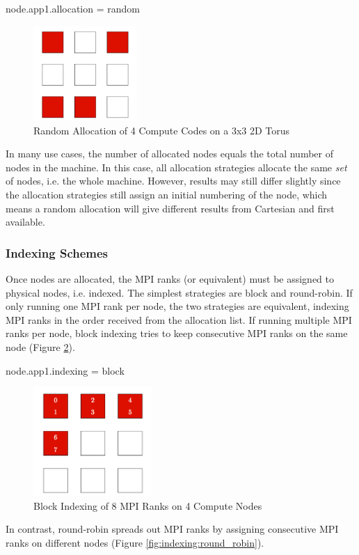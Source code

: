 \begin{ViFile}
node.app1.allocation = random
\end{ViFile}
\begin{figure}[h]
\centering
\includegraphics[width=0.35\textwidth]{figures/tikz/allocation/random.png}
\caption{Random Allocation of 4 Compute Codes on a 3x3 2D Torus}
\label{fig:allocation:random}
\end{figure}

In many use cases, the number of allocated nodes equals the total number of nodes in the machine.
In this case, all allocation strategies allocate the same \emph{set} of nodes, i.e. the whole machine.
However, results may still differ slightly since the allocation strategies still assign an initial numbering of the node,
which means a random allocation will give different results from Cartesian and first available.


\subsubsection{Indexing Schemes}
\label{subsec:tutorial:indexing}
Once nodes are allocated, the MPI ranks (or equivalent) must be assigned to physical nodes, i.e. indexed.
The simplest strategies are block and round-robin.  If only running one MPI rank per node, the two strategies are equivalent,
indexing MPI ranks in the order received from the allocation list.
If running multiple MPI ranks per node, block indexing tries to keep consecutive MPI ranks on the same node (Figure \ref{fig:indexing:block}).

\begin{ViFile}
node.app1.indexing = block
\end{ViFile}
\begin{figure}[h]
\centering
\includegraphics[width=0.4\textwidth]{figures/tikz/indexing/block.png}
\caption{Block Indexing of 8 MPI Ranks on 4 Compute Nodes}
\label{fig:indexing:block}
\end{figure}
In contrast, round-robin spreads out MPI ranks by assigning consecutive MPI ranks on different nodes (Figure \ref{fig:indexing:round_robin}).

